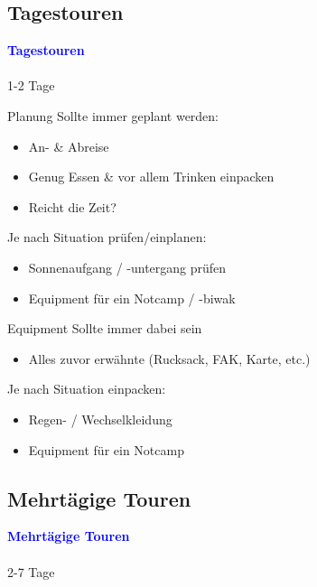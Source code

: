\documentclass[aspectratio=169]{beamer}
\begin{document}
		\subsection{Tagestouren}
		
			\begin{frame}
				\vspace{1cm}
				\begin{center}
					\textcolor{blue}{\textbf{Tagestouren}}
					\\\,\\
					{\scriptsize 1-2 Tage}
				\end{center}
			\end{frame}
			
			\begin{frame}{Planung}
				Sollte immer geplant werden:
				\begin{itemize}
					\item An- \& Abreise
					\item Genug Essen \& vor allem Trinken einpacken
					\item Reicht die Zeit?
				\end{itemize}
				Je nach Situation prüfen/einplanen:
				\begin{itemize}
					\item Sonnenaufgang / -untergang prüfen
					\item Equipment für ein Notcamp / -biwak
				\end{itemize}
			\end{frame}
			
			\begin{frame}{Equipment}
				Sollte immer dabei sein
				\begin{itemize}
					\item Alles zuvor erwähnte (Rucksack, FAK, Karte, etc.)
				\end{itemize}
				Je nach Situation einpacken:
				\begin{itemize}
					\item Regen- / Wechselkleidung
					\item Equipment für ein Notcamp
				\end{itemize}
			\end{frame}
			
		\subsection{Mehrtägige Touren}
		
			\begin{frame}
				\vspace{1cm}
				\begin{center}
					\textcolor{blue}{\textbf{Mehrtägige Touren}}
					\\\,\\
					{\scriptsize 2-7 Tage}
				\end{center}
			\end{frame}
		
\end{document}
